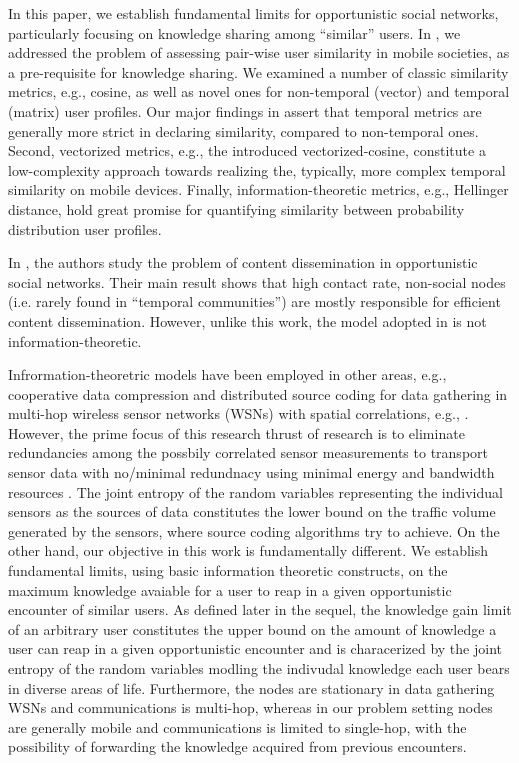 \documentclass[conference]{IEEEtran}
\theoremstyle{definition}
\begin{document}
In this paper, we establish fundamental limits for opportunistic social 
networks, particularly focusing on knowledge sharing among ``similar'' users. 
In \cite{mai14}, we addressed the problem of assessing pair-wise user similarity
in mobile societies, as a pre-requisite for knowledge sharing. We examined a 
number of classic similarity metrics, e.g., cosine, as well as novel ones 
for non-temporal (vector) and temporal (matrix) user profiles. Our major findings 
in \cite{mai14} assert that temporal metrics are generally more strict in declaring similarity, 
compared to non-temporal ones. Second, vectorized metrics, e.g., the introduced 
vectorized-cosine, constitute a low-complexity approach towards realizing the, typically, more complex temporal similarity on mobile devices. Finally, information-theoretic metrics, e.g., Hellinger distance, hold great promise for quantifying similarity between probability distribution user profiles. 


In \cite{mobihoc}, the authors study the problem of content dissemination in 
opportunistic social networks. Their main result shows that high contact rate, 
non-social nodes (i.e. rarely found in ``temporal communities'') are mostly 
responsible for efficient content dissemination. However, unlike this work, the 
model adopted in \cite{mobihoc} is not information-theoretic. 

Infrormation-theoretric models have been employed in other areas, e.g., cooperative data compression and distributed source coding for data gathering in multi-hop wireless sensor networks (WSNs) with spatial correlations, e.g., \cite{ramachandran,servetto,marco,govindan,elbatt}. However, the prime focus of this research thrust of research is to eliminate redundancies 
among the possbily correlated sensor measurements to transport sensor data with no/minimal 
redundnacy using minimal energy and bandwidth resources \cite{govindan,servetto}. The joint entropy of the random variables representing the individual sensors as the sources of data constitutes the lower bound on the traffic volume generated by the sensors, where source coding algorithms try to achieve. On the other hand, our objective in this work is fundamentally different. We establish fundamental limits, using basic information theoretic constructs, on the maximum knowledge avaiable for a user to reap in a given opportunistic encounter of similar users. As defined later in the sequel, the knowledge gain limit of an arbitrary user constitutes the upper bound on the amount of knowledge a user can reap in a given opportunistic encounter and is characerized by the joint entropy of the random variables modling the indivudal knowledge each user bears in diverse areas of life. Furthermore, the nodes are stationary in data gathering WSNs and communications is multi-hop, whereas in our problem setting nodes are generally mobile and communications is limited to single-hop, with the possibility of forwarding the knowledge acquired from previous encounters.
\end{document}
